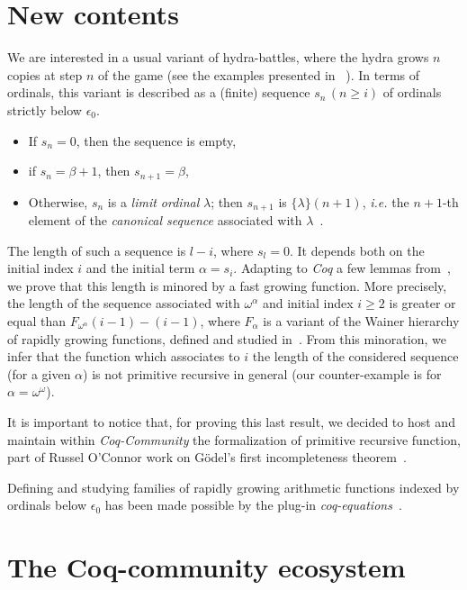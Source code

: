 \documentclass{easychair}
\newcommand{\canonseq}[2]{\mbox{$\{#1\}(#2)$}}
\begin{document}
\section{New contents}
We are interested in a usual variant of hydra-battles, where the hydra grows $n$ copies at step $n$ of the game (see the examples presented in ~\cite{KP82, BauerHydra}).
In terms of ordinals, this variant is described as a (finite) sequence $s_n\,(n\geq i)$ of ordinals strictly below $\epsilon_0$.
\begin{itemize}
\item If $s_n=0$, then the sequence is empty,
\item if $s_n=\beta+1$, then $s_{n+1}=\beta$,
\item Otherwise, $s_n$ is a \emph{limit ordinal} $\lambda$; then $s_{n+1}$ is $\canonseq{\lambda}{n+1}$, \emph{i.e.} the
    $n+1$-th element of the \emph{canonical sequence} associated with $\lambda$~\cite{KS81}.
\end{itemize} 

The length of such a sequence is $l-i$, where $s_l=0$. It depends both on the initial index $i$ and the initial term $\alpha=s_i$. Adapting to \emph{Coq} a few lemmas from~\cite{KS81}, we prove that this length is minored by a fast growing function.
More precisely, the length  of the sequence associated with
$\omega^\alpha$ and initial index $i\geq 2$ is greater or equal than
$F_{\omega^\alpha}(i-1)-(i-1)$, where $F_\alpha$ is a variant of the Wainer hierarchy of rapidly growing functions, defined and studied in~\cite{KS81}.
From this minoration, we infer that the function which associates to $i$ the length of the considered sequence (for a given $\alpha$) is not primitive recursive in general (our counter-example is for $\alpha=\omega^\omega$).

It is important to notice that, for proving this last result, we decided to host and maintain within \emph{Coq-Community} the formalization of primitive recursive function, part of Russel O'Connor work on G\"{o}del's first incompleteness theorem~\cite{OConnor05}.

Defining and studying families of rapidly growing arithmetic  functions indexed by ordinals below $\epsilon_0$ has been made possible by the plug-in \emph{coq-equations}~\cite{sozeau:hal-01671777}.


\section{The Coq-community ecosystem}
\end{document}
